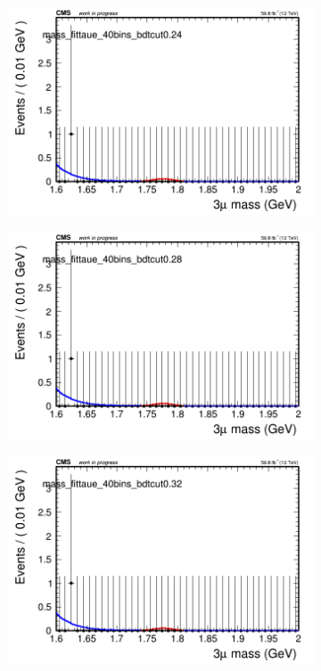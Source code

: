 \begin{figure}[H]
\begin{subfigure}{0.2\textwidth}
        \includegraphics[width=\textwidth]{unfixed_exp/plots/taue/massfit_taue_40bins_bdtcut0.24.png}
        \caption{}
    \end{subfigure}
    \begin{subfigure}{0.2\textwidth}
        \includegraphics[width=\textwidth]{unfixed_exp/plots/taue/massfit_taue_40bins_bdtcut0.28.png}
        \caption{}
    \end{subfigure}
    \begin{subfigure}{0.2\textwidth}
        \includegraphics[width=\textwidth]{unfixed_exp/plots/taue/massfit_taue_40bins_bdtcut0.32.png}

\end{subfigure}
\end{figure}
